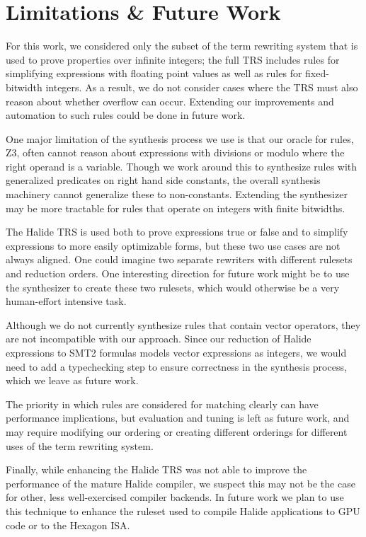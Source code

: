 \documentclass[acmsmall,review,anonymous]{acmart}\settopmatter{printfolios=true,printccs=false,printacmref=false}
\begin{document}
\section{Limitations \& Future Work}
\label{sec:limitations}
For this work, we considered only the subset of the term rewriting system that
is used to prove properties over infinite integers; the full TRS includes rules
for simplifying expressions with floating point values as well as rules for
fixed-bitwidth integers.  As a result, we do not consider cases where the TRS
must also reason about whether overflow can occur.  Extending our improvements
and automation to such rules could be done in future work.

One major limitation of the synthesis process we use is that our oracle
for rules, Z3, often cannot reason about expressions with divisions or modulo
where the right operand is a variable.  Though we work around this to
synthesize rules with generalized predicates on right hand side constants,
the overall synthesis machinery cannot generalize these to non-constants.
Extending the synthesizer may be more tractable for rules that operate
on integers with finite bitwidths.

The Halide TRS is used both to prove expressions true or false and to
simplify expressions to more easily optimizable forms, but these two use cases
are not always aligned. One could imagine two separate rewriters with
different rulesets and reduction orders. One interesting direction for future
work might be to use the synthesizer to create these two rulesets, which would
otherwise be a very human-effort intensive task.

Although we do not currently synthesize rules that contain vector operators,
they are not incompatible with our approach. Since our reduction of Halide
expressions to SMT2 formulas models vector expressions as integers, we would need
to add a typechecking step to ensure correctness in the synthesis process, which
we leave as future work.

The priority in which rules are considered for matching clearly can have
performance implications, but evaluation and tuning is left as future work, and
may require modifying our ordering or creating different orderings for different
uses of the term rewriting system.

Finally, while enhancing the Halide TRS was not able to improve the performance of the mature Halide compiler, we suspect this may not be the case for other, less well-exercised compiler backends. In future work we plan to use this technique to enhance the ruleset used to compile Halide applications to GPU code or to the Hexagon ISA.
\end{document}

